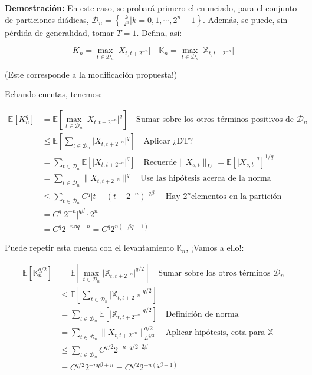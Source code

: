 \textbf{Demostración:} En este caso, se probará primero el enunciado, para el conjunto de particiones diádicas, $\mathcal{D}_n = \left\{\ \frac{k}{2^n} \vert k = 0, 1, \cdots, 2^n - 1 \right\}$. Además, se puede, sin pérdida de generalidad, tomar $T = 1$. Defina, así:

\[
	K_n = \max_{t \in \mathcal{D}_n} \lvert X_{t, t + 2^{-n}} \rvert \quad \mathbb{K}_n = \max_{t \in \mathcal{D}_n} \lvert \mathbb{X}_{t, t + 2^{-n}} \rvert
\]

(Este corresponde a la modificación propuesta!)

Echando cuentas, tenemos:

\begin{align*}
	\mathbb{E}[K^q_n] &= \mathbb{E}\left[  \max_{t \in \mathcal{D}_n} \lvert X_{t, t + 2^{-n}} \rvert^q \right] \quad \text{Sumar sobre los otros términos positivos de } \mathcal{D}_n \\
	&\leq \mathbb{E} \left[ \sum_{t \in \mathcal{D}_n} \lvert X_{t, t + 2^{-n}} \rvert^q \right] \quad \text{Aplicar ¿DT?} \\
	&= \sum_{t \in \mathcal{D}_n} \mathbb{E} [ \lvert X_{t, t + 2^{-n}} \rvert^q ] \quad \text{Recuerde} \lVert X_{s,t} \rVert_{L^q} = \mathbb{E}[ \lvert X_{s,t} \rvert^q ]^{1/q} \\
	&= \sum_{t \in \mathcal{D}_n} \lVert X_{t,t+ 2^{-n}} \rVert^q \quad \text{Use las hipótesis acerca de la norma}  \\
	&\leq \sum_{t \in \mathcal{D}_n} C^q \lvert t - (t - 2^{-n}) \rvert^{q \beta} \quad \text{ Hay } 2^n \text{elementos en la partición} \\
	&= C^q \lvert 2^{-n} \rvert^{q \beta} \cdot 2^n \\
	&= C^q 2^{-n \beta q + n} = C^q 2^{n (- \beta q + 1)}
\end{align*}

Puede repetir esta cuenta con el levantamiento $\mathbb{K}_n$, ¡Vamos a ello!: 

\begin{align*}
	\mathbb{E}[ \mathbb{K}_n^{q/2} ] &= \mathbb{E}[ \max_{t \in \mathcal{D}_n} \lvert \mathbb{X}_{t, t + 2^{-n}}  \rvert^{q/2} ] \quad \text{Sumar sobre los otros términos } \mathcal{D}_n \\
	&\leq \mathbb{E}\left[ \sum_{t \in \mathcal{D}_n}  \lvert \mathbb{X}_{t, t + 2^{-n}} \rvert^{q/2} \right] \\
	&= \sum_{t \in \mathcal{D}_n} \mathbb{E} [\lvert \mathbb{X}_{t, t + 2^{-n}} \rvert^{q/2}] \quad \text{Definición de norma} \\
	&= \sum_{t \in \mathcal{D}_n} \lVert X_{t, t + 2^{-n}} \rVert_ {L^{q/2}}^{q/2} \quad \text{Aplicar hipótesis, cota para } \mathbb{X} \\
	&\leq \sum_{t \in \mathcal{D}_n} C^{q/2} 2^{-n \cdot q/2 \cdot 2\beta} \\
	&= C^{q/2} 2^{-nq\beta + n} = C^{q/2} 2^{-n(q \beta - 1 )}
\end{align*}


